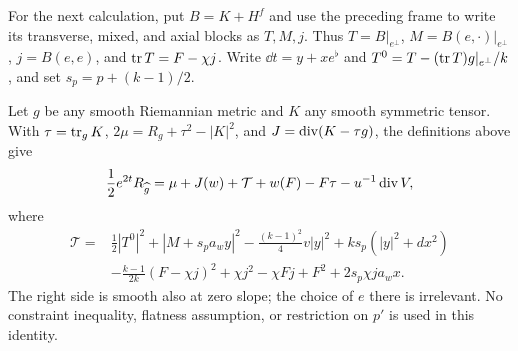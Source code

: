 For the next calculation, put $B=K+H^f$ and use the preceding frame to
write its transverse, mixed, and axial blocks as $T,M,j$.  Thus
$T=B|_{e^\perp}$, $M=B(e,\cdot)|_{e^\perp}$, $j=B(e,e)$, and
$\operatorname{tr} T=F-\chi j$.  Write $\dd t=y+x e^\flat$ and
$T^0=T-(\operatorname{tr} T)g|_{e^\perp}/k$, and set $s_p=p+(k-1)/2$.

\begin{proposition}
\label{alg:curvature-proposition}
Let $g$ be any smooth Riemannian metric and $K$ any smooth symmetric
tensor.  With $\tau=\operatorname{tr}_gK$,
$2\mu=R_g+\tau^2-|K|^2$, and $J=\operatorname{div}(K-\tau g)$, the definitions
above give
\begin{equation}
 \frac12 e^{2t}R_{\widehat g}
 =\mu+J(w)+\mathcal T+w(F)-F\tau-u^{-1}\operatorname{div} V,
 \label{alg:scalar-identity}
\end{equation}
where
\begin{equation}
\begin{split}
 \mathcal T={}&\frac12|T^0|^2+|M+s_pa_w y|^2
 -\frac{(k-1)^2}{4}v|y|^2
 +ks_p(|y|^2+dx^2)\\
 &-\frac{k-1}{2k}(F-\chi j)^2+\chi j^2-\chi Fj+F^2
 +2s_p\chi j a_wx .
\end{split}
\label{alg:remainder}
\end{equation}
The right side is smooth also at zero slope; the choice of $e$ there is
irrelevant.  No constraint inequality, flatness assumption, or restriction
on $p'$ is used in this identity.
\end{proposition}

